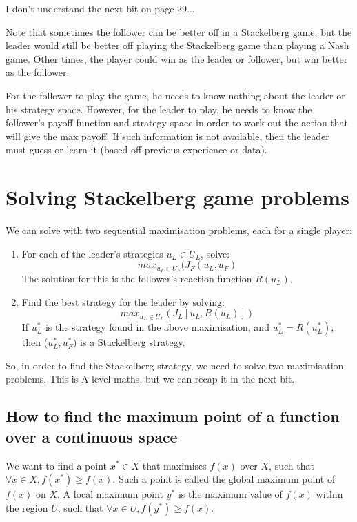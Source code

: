 I don't understand the next bit on page 29...


Note that sometimes the follower can be better off in a Stackelberg game, but
the leader would still be better off playing the Stackelberg game than playing a
Nash game. Other times, the player could win as the leader or follower, but win
better as the follower.

For the follower to play the game, he needs to know nothing about the leader or
his strategy space. However, for the leader to play, he needs to know the
follower's payoff function and strategy space in order to work out the action
that will give the max payoff. If such information is not available, then the
leader must guess or learn it (based off previous experience or data).


\section{Solving Stackelberg game problems}

We can solve with two sequential maximisation problems, each for a single
player:

\begin{enumerate}
  \item For each of the leader's strategies $u_L \in U_L$, solve:
    \[
      max_{u_F \in U_F}(J_F(u_L, u_F)
    \]
    The solution for this is the follower's reaction function $R(u_L)$.
  \item Find the best strategy for the leader by solving:
    \[
      max_{u_L \in U_L}(J_L[u_L, R(u_L)])
    \]
    If $u^*_L$ is the strategy found in the above maximisation, and
    $u^*_L = R(u^*_L)$, then ($u^*_L, u^*_F)$ is a Stackelberg strategy.
\end{enumerate}

So, in order to find the Stackelberg strategy, we need to solve two maximisation
problems. This is A-level maths, but we can recap it in the next bit.

\subsection{How to find the maximum point of a function over a continuous space}

We want to find a point $x^* \in X$ that maximises $f(x)$ over $X$, such that
$\forall x \in X, f(x^*) \geq f(x)$. Such a point is called the global maximum
point of $f(x)$ on $X$. A local maximum point $y^*$ is the maximum value of
$f(x)$ within the region $U$, such that $\forall x \in U, f(y^*) \geq f(x)$.


